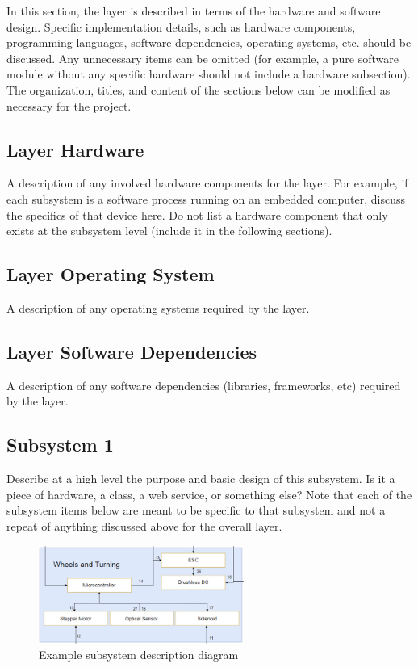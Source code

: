 In this section, the layer is described in terms of the hardware and software design. Specific implementation details, such as hardware components, programming languages, software dependencies, operating systems, etc. should be discussed. Any unnecessary items can be omitted (for example, a pure software module without any specific hardware should not include a hardware subsection). The organization, titles, and content of the sections below can be modified as necessary for the project.

\subsection{Layer Hardware}
A description of any involved hardware components for the layer. For example, if each subsystem is a software process running on an embedded computer, discuss the specifics of that device here. Do not list a hardware component that only exists at the subsystem level (include it in the following sections).

\subsection{Layer Operating System}
A description of any operating systems required by the layer.

\subsection{Layer Software Dependencies}
A description of any software dependencies (libraries, frameworks, etc) required by the layer.

\subsection{Subsystem 1}
Describe at a high level the purpose and basic design of this subsystem. Is it a piece of hardware, a class, a web service, or something else? Note that each of the subsystem items below are meant to be specific to that subsystem and not a repeat of anything discussed above for the overall layer.

\begin{figure}[h!]
	\centering
 	\includegraphics[width=0.60\textwidth]{images/WaT.png} %
 \caption{Example subsystem description diagram} %
\end{figure}

